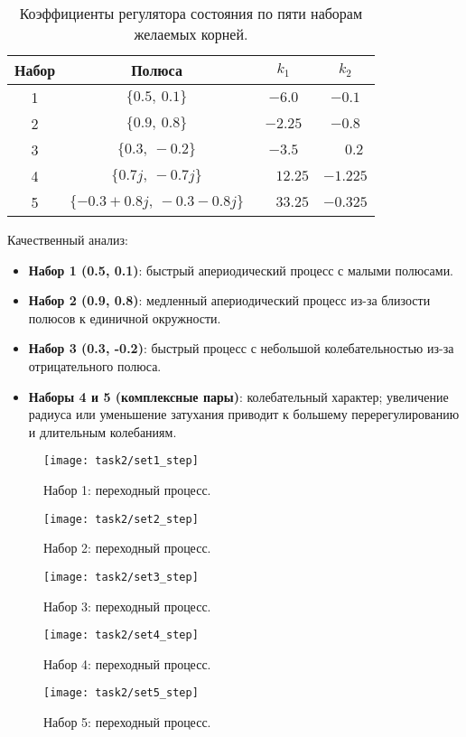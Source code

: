 \begin{table}[H]
  \centering
  \begin{tabular}{cccc}
    \toprule
    Набор & Полюса & $k_1$ & $k_2$ \\
    \midrule
    1 & $\{0.5,\ 0.1\}$ & $-6.0$ & $-0.1$ \\
    2 & $\{0.9,\ 0.8\}$ & $-2.25$ & $-0.8$ \\
    3 & $\{0.3,\ -0.2\}$ & $-3.5$ & $\phantom{-}0.2$ \\
    4 & $\{0.7j,\ -0.7j\}$ & $\phantom{-}12.25$ & $-1.225$ \\
    5 & $\{-0.3\!+\!0.8j,\ -0.3\!-\!0.8j\}$ & $\phantom{-}33.25$ & $-0.325$ \\
    \bottomrule
  \end{tabular}
  \caption{Коэффициенты регулятора состояния по пяти наборам желаемых корней.}
\end{table}

Качественный анализ:
\begin{itemize}
  \item \textbf{Набор 1 (0.5, 0.1)}: быстрый апериодический процесс с малыми полюсами.
  \item \textbf{Набор 2 (0.9, 0.8)}: медленный апериодический процесс из-за близости полюсов к единичной окружности.
  \item \textbf{Набор 3 (0.3, -0.2)}: быстрый процесс с небольшой колебательностью из-за отрицательного полюса.
  \item \textbf{Наборы 4 и 5 (комплексные пары)}: колебательный характер; увеличение радиуса или уменьшение затухания приводит к большему перерегулированию и длительным колебаниям.
\end{itemize}

\begin{figure}[H]
  \centering
  \texttt{[image: task2/set1\_step]}
  \caption{Набор 1: переходный процесс.}
  \label{fig:task2_set1}
\end{figure}
\begin{figure}[H]
  \centering
  \texttt{[image: task2/set2\_step]}
  \caption{Набор 2: переходный процесс.}
  \label{fig:task2_set2}
\end{figure}
\begin{figure}[H]
  \centering
  \texttt{[image: task2/set3\_step]}
  \caption{Набор 3: переходный процесс.}
  \label{fig:task2_set3}
\end{figure}
\begin{figure}[H]
  \centering
  \texttt{[image: task2/set4\_step]}
  \caption{Набор 4: переходный процесс.}
  \label{fig:task2_set4}
\end{figure}
\begin{figure}[H]
  \centering
  \texttt{[image: task2/set5\_step]}
  \caption{Набор 5: переходный процесс.}
  \label{fig:task2_set5}
\end{figure}

